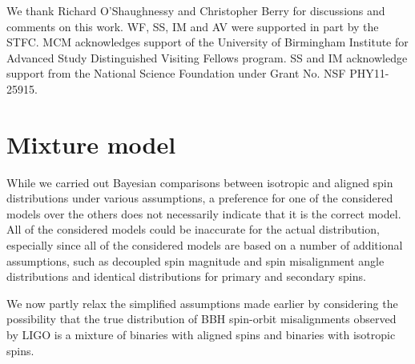 \documentclass[modern,linenumbers]{aastex61}
\begin{document}
\acknowledgements

We thank Richard O'Shaughnessy and Christopher Berry for discussions and
comments on this work.  WF, SS, IM and AV were supported in part by the STFC.  MCM acknowledges support of the University of
Birmingham Institute for Advanced Study Distinguished Visiting Fellows
program.   SS and IM acknowledge support from the National Science Foundation under Grant No. NSF PHY11-25915.

\appendix

\section{Mixture model}

While we carried out Bayesian comparisons between isotropic and aligned spin distributions under various assumptions, a preference for one of the considered models over the others does not necessarily indicate that it is the correct model.  All of the considered models could be inaccurate for the actual distribution, especially since all of the considered models are based on a number of additional assumptions, such as decoupled spin magnitude and spin misalignment angle distributions and identical distributions for primary and secondary spins.

We now partly relax the simplified assumptions made earlier by considering the possibility that the true distribution of BBH spin-orbit misalignments observed by LIGO is a mixture of binaries with aligned spins and binaries with isotropic spins.
\end{document}

